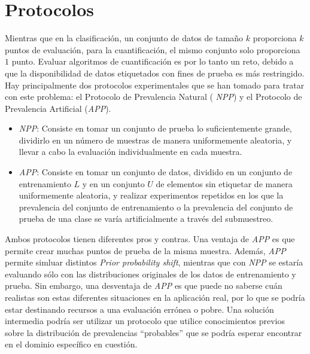 \section{Protocolos}\label{evaluacion:protocolos}

Mientras que en la clasificación, un conjunto de datos de tamaño $k$ proporciona
$k$ puntos de evaluación, para la cuantificación, el mismo conjunto solo
proporciona $1$ punto. Evaluar algoritmos de cuantificación es por lo tanto un
reto, debido a que la disponibilidad de datos etiquetados con fines de prueba es
más restringido. Hay principalmente dos protocolos experimentales que se han
tomado para tratar con este problema: el Protocolo de Prevalencia Natural ({\it
NPP\/}) y el Protocolo de Prevalencia Artificial ({\it APP\/}).

\begin{itemize}
    \item {\it NPP\/}: Consiste en tomar un conjunto de prueba lo
    suficientemente grande, dividirlo en un número de muestras de manera
    uniformemente aleatoria, y llevar a cabo la evaluación individualmente en
    cada muestra.
    \item {\it APP\/}: Consiste en tomar un conjunto de datos, dividido en un
    conjunto de entrenamiento $L$ y en un conjunto $U$ de elementos sin
    etiquetar de manera uniformemente aleatoria, y realizar experimentos
    repetidos en los que la prevalencia del conjunto de entrenamiento o la
    prevalencia del conjunto de prueba de una clase se varía artificialmente a
    través del submuestreo.
\end{itemize}

Ambos protocolos tienen diferentes pros y contras. Una ventaja de {\it APP\/} es
que permite crear muchas puntos de prueba de la misma muestra. Además, {\it
APP\/} permite simluar distintos {\it Prior probability shift}, mientras que con
{\it NPP\/} se estaría evaluando sólo con las distribuciones originales de los
datos de entrenamiento y prueba. Sin embargo, una desventaja de {\it APP\/} es
que puede no saberse cuán realistas son estas diferentes situaciones en la
aplicación real, por lo que se podría estar destinando recursos a una evaluación
errónea o pobre. Una solución intermedia podría ser utilizar un protocolo que
utilice conocimientos previos sobre la distribución de prevalencias “probables”
que se podría esperar encontrar en el dominio específico en cuestión.
